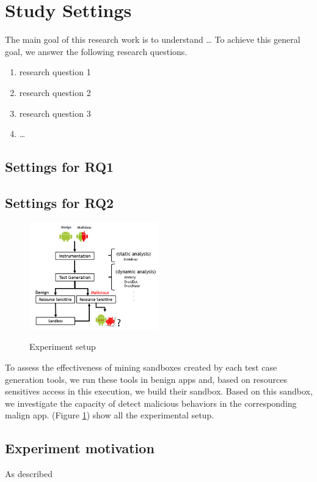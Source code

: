 \section{Study Settings}

The main goal of this research work is
to understand \ldots
To achieve this general goal, we answer the following
research questions. 


\begin{enumerate}[(RQ1)]
\item research question 1
\item research question 2
\item research question 3
\item \ldots
\end{enumerate}

\subsection{Settings for RQ1}

\subsection{Settings for RQ2}


\begin{figure}[h!]
  \includegraphics[width=0.5\textwidth]{images/setup.png}
  \label{Experiment setup}
  \caption{Experiment setup}
  \label{fig:setup}
\end{figure}

To assess the effectiveness of mining sandboxes created by each test case generation tools, we run these tools in benign apps and, based on resources sensitives access in this execution, we build their sandbox. Based on this sandbox, we investigate the capacity of detect malicious behaviors in the corresponding malign app. (Figure  \ref{fig:setup}) show all the experimental setup.

\subsection{Experiment motivation}

As described 
